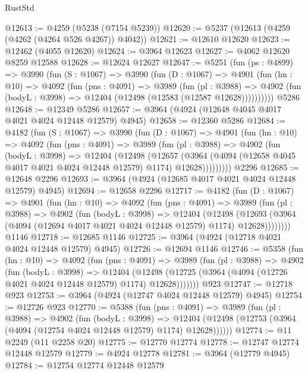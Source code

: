 \begin{lexlean}{RustStd}
\begin{coremodule}
{\begin{coremodule}
{{{{{{{{{{{{{{{{{{{{{{{{{{{{{{{{{{{{{{@12613 := @4259 (@5238 (@7154 @5239))
@12620 := @5237 (@12613 (@4259 (@4262 (@4264 @526 @4267)) @4042))
@12621 := @12610 @12620
@12623 := @12462 (@4055 @12620)
@12624 := @3964 @12623
@12627 := @4062 @12620 @8259 @12588
@12628 := @12624 @12627
@12647 := @5251
    (fun (ps : @4899) =>
    @3990
      (fun (S : @1067) =>
      @3990
        (fun (D : @1067) =>
        @4901
          (fun (hn : @10) =>
          @4092
            (fun (pns : @4091) =>
            @3989
              (fun (pl : @3988) =>
              @4902 (fun (bodyL : @3998) => @12404 (@12498 (@12583 (@12587 @12628))))))))))
    @5286
@12648 := @12349 @5286
@12657 := @3964 (@4924 (@12648 @4045 @4017 @4021 @4024 @12448 @12579) @4945)
@12658 := @12360 @5286
@12684 := @4182
    (fun (S : @1067) =>
    @3990
      (fun (D : @1067) =>
      @4901
        (fun (hn : @10) =>
        @4092
          (fun (pns : @4091) =>
          @3989
            (fun (pl : @3988) =>
            @4902
              (fun (bodyL : @3998) =>
              @12404
                (@12498
                  (@12657
                    (@3964
                      (@4094 (@12658 @4045 @4017 @4021 @4024 @12448 @12579) @1174)
                      @12628)))))))))
    @2296
@12685 := @12648 @2296
@12693 := @3964 (@4924 (@12685 @4017 @4021 @4024 @12448 @12579) @4945)
@12694 := @12658 @2296
@12717 := @4182
    (fun (D : @1067) =>
    @4901
      (fun (hn : @10) =>
      @4092
        (fun (pns : @4091) =>
        @3989
          (fun (pl : @3988) =>
          @4902
            (fun (bodyL : @3998) =>
            @12404
              (@12498
                (@12693 (@3964 (@4094 (@12694 @4017 @4021 @4024 @12448 @12579) @1174) @12628))))))))
    @1146
@12718 := @12685 @1146
@12725 := @3964 (@4924 (@12718 @4021 @4024 @12448 @12579) @4945)
@12726 := @12694 @1146
@12746 := @5358
    (fun (hn : @10) =>
    @4092
      (fun (pns : @4091) =>
      @3989
        (fun (pl : @3988) =>
        @4902
          (fun (bodyL : @3998) =>
          @12404
            (@12498 (@12725 (@3964 (@4094 (@12726 @4021 @4024 @12448 @12579) @1174) @12628)))))))
    @923
@12747 := @12718 @923
@12753 := @3964 (@4924 (@12747 @4024 @12448 @12579) @4945)
@12754 := @12726 @923
@12770 := @5388
    (fun (pns : @4091) =>
    @3989
      (fun (pl : @3988) =>
      @4902
        (fun (bodyL : @3998) =>
        @12404 (@12498 (@12753 (@3964 (@4094 (@12754 @4024 @12448 @12579) @1174) @12628))))))
@12774 := @11 @2249 (@11 @2258 @20)
@12775 := @12770 @12774
@12778 := @12747 @12774 @12448 @12579
@12779 := @4924 @12778
@12781 := @3964 (@12779 @4945)
@12784 := @12754 @12774 @12448 @12579
}}}}}}}}}}}}}}}}}}}}}}}}}}}}}}}}}}}}}}
\end{coremodule}}
\end{coremodule}
\end{lexlean}
